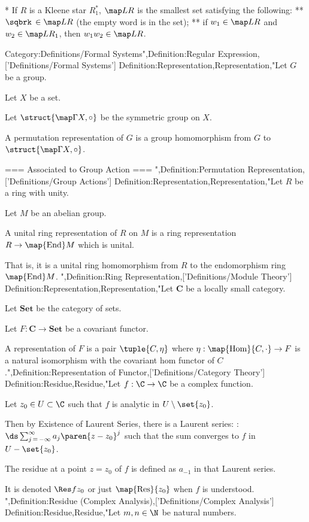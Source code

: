 * If $R$ is a Kleene star $R_1^*$, $\map L R$ is the smallest set satisfying the following:
** $\sqbrk \, \in \map L R$ (the empty word is in the set);
** if $w_1 \in \map L R$ and $w_2 \in \map L {R_1}$, then $w_1 w_2 \in \map L R$.

Category:Definitions/Formal Systems",Definition:Regular Expression,['Definitions/Formal Systems']
Definition:Representation,Representation,"Let $G$ be a group.

Let $X$ be a set.

Let $\struct {\map \Gamma X, \circ}$ be the symmetric group on $X$.


A permutation representation of $G$ is a group homomorphism from $G$ to $\struct {\map \Gamma X, \circ}$.


=== Associated to Group Action ===
",Definition:Permutation Representation,['Definitions/Group Actions']
Definition:Representation,Representation,"Let $R$ be a ring with unity.

Let $M$ be an abelian group.


A unital ring representation of $R$ on $M$ is a ring representation $R \to \map {\operatorname {End} } M$ which is unital.

That is, it is a unital ring homomorphism from $R$ to the endomorphism ring $\map {\operatorname {End} } M$.
",Definition:Ring Representation,['Definitions/Module Theory']
Definition:Representation,Representation,"Let $\mathbf C$ be a locally small category.

Let $\mathbf{Set}$ be the category of sets.

Let $F : \mathbf C \to \mathbf{Set}$ be a covariant functor.


A representation of $F$ is a pair $\tuple {C, \eta}$ where $\eta : \map {\operatorname {Hom} } {C, \cdot} \to F$ is a natural isomorphism with the covariant hom functor of $C$.",Definition:Representation of Functor,['Definitions/Category Theory']
Definition:Residue,Residue,"Let $f: \C \to \C$ be a complex function.

Let $z_0 \in U \subset \C$ such that $f$ is analytic in $U \setminus \set {z_0}$.


Then by Existence of Laurent Series, there is a Laurent series:
:$\ds \sum_{j \mathop = -\infty}^\infty a_j \paren {z - z_0}^j$
such that the sum converges to $f$ in $U - \set {z_0}$.  


The residue at a point $z = z_0$ of $f$ is defined as $a_{-1}$ in that Laurent series.

It is denoted $\Res f {z_0}$ or just $\map {\mathrm {Res} } {z_0}$ when $f$ is understood.
",Definition:Residue (Complex Analysis),['Definitions/Complex Analysis']
Definition:Residue,Residue,"Let $m, n \in \N$ be natural numbers.


